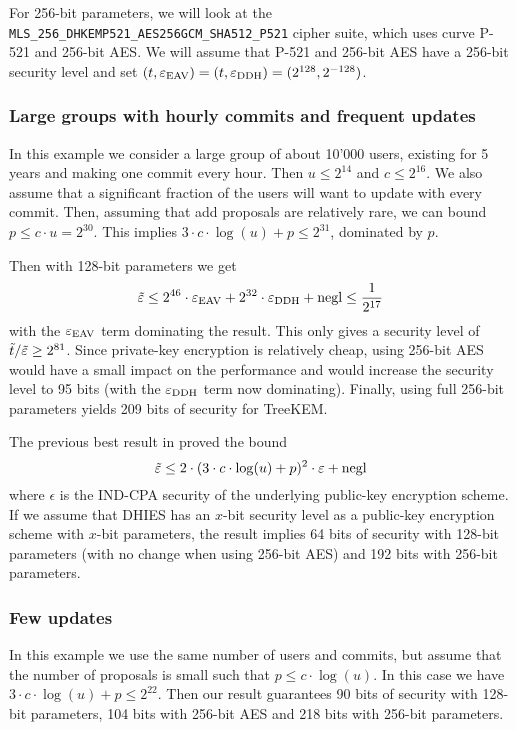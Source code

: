 For 256-bit parameters, we will look at the \texttt{MLS\_256\_DHKEMP521\_AES256GCM\_SHA512\_P521} cipher suite, which uses curve P-521 and 256-bit AES. We will assume that P-521 and 256-bit AES have a 256-bit security level and set $(t, \varepsilon_\mathrm{EAV}) = (t, \varepsilon_\mathrm{DDH}) = (2^{128}, 2^{-128})$.

\subsubsection{Large groups with hourly commits and frequent updates}

In this example we consider a large group of about 10'000 users, existing for 5 years and making one commit every hour. Then $u \le 2^{14}$ and $c \le 2^{16}$. We also assume that a significant fraction of the users will want to update with every commit. Then, assuming that add proposals are relatively rare, we can bound $p \le c \cdot u = 2^{30}$. This implies $3 \cdot c \cdot \log(u) + p \le 2^{31}$, dominated by $p$.

Then with 128-bit parameters we get
\[
	\tilde{\varepsilon} \le 2^{46} \cdot \varepsilon_\mathrm{EAV} + 2^{32} \cdot \varepsilon_\mathrm{DDH} + \mathrm{negl} \le \frac{1}{2^{17}}
\]
with the $\varepsilon_\mathrm{EAV}$ term dominating the result. This only gives a security level of $\tilde{t}/\tilde{\varepsilon} \ge 2^{81}$. Since private-key encryption is relatively cheap, using 256-bit AES would have a small impact on the performance and would increase the security level to 95 bits (with the $\varepsilon_\mathrm{DDH}$ term now dominating). Finally, using full 256-bit parameters yields 209 bits of security for TreeKEM.

The previous best result in \cite[Theorem 3]{ttkem} proved the bound
\[
	\tilde{\varepsilon} \le 2 \cdot (3 \cdot c \cdot \log(u) + p)^2 \cdot \varepsilon + \mathrm{negl}
\]
where $\epsilon$ is the IND-CPA security of the underlying public-key encryption scheme. If we assume that DHIES has an $x$-bit security level as a public-key encryption scheme with $x$-bit parameters, the result implies 64 bits of security with 128-bit parameters (with no change when using 256-bit AES) and 192 bits with 256-bit parameters.

\subsubsection{Few updates}

In this example we use the same number of users and commits, but assume that the number of proposals is small such that $p \le c \cdot \log(u)$. In this case we have $3 \cdot c \cdot \log(u) + p \le 2^{22}$. Then our result guarantees 90 bits of security with 128-bit parameters, 104 bits with 256-bit AES and 218 bits with 256-bit parameters.

